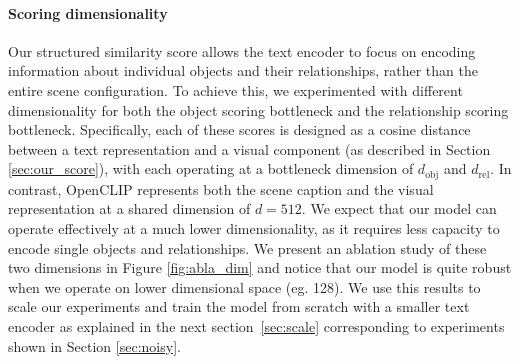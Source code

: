 \iffalse
\begin{figure}[ht]
\centering
    \begin{subfigure}[b]{0.2\textwidth}
        \centering    
    \texttt{[image: figures/ablation\_task\_coef\_swap\_att.pdf]}
        \caption{Swap Att}
    \end{subfigure}%
    \hfill
    \begin{subfigure}[b]{0.2\textwidth}
        \centering    \texttt{[image: figures/ablation\_task\_coef\_swap\_obj.pdf]}
        \caption{Swap Obj}
    \end{subfigure}%
    \hfill
    \begin{subfigure}[b]{0.2\textwidth}
        \centering    \texttt{[image: figures/ablation\_task\_coef\_replace\_obj.pdf]}
        \caption{Replace Obj}
    \end{subfigure}%
    \hfill
    \begin{subfigure}[b]{0.2\textwidth}
        \centering    \texttt{[image: figures/ablation\_task\_coef\_replace\_att.pdf]}
        \caption{Replace Att}
    \end{subfigure}%
    \hfill
    \begin{subfigure}[b]{0.19\textwidth}
        \centering    \texttt{[image: figures/ablation\_task\_coef\_replace\_rel.pdf]}
        \caption{Replace Rel}
    \end{subfigure}%
  \caption{ \textbf{Local Perturbed Graphs Ablation} In this ablations we keep the initialization seed fixed and include a perturbed graph as a negative sample inside the loss by swapping the order of the subject and object (y-axis), $\bar{G}$ or sampling random subject and object within the positive scene graph (x-axis), $\tilde{G}$.}
  \label{fig:abla_coefs}
\end{figure}
\fi

\paragraph{Scoring dimensionality} Our structured similarity score allows the text encoder to focus on encoding information about individual objects and their relationships, rather than the entire scene configuration. To achieve this, we experimented with different dimensionality for both the object scoring bottleneck and the relationship scoring bottleneck. Specifically, each of these scores is designed as a cosine distance between a text representation and a visual component (as described in Section \ref{sec:our_score}), with each operating at a bottleneck dimension of $d_{\text{obj}}$ and $d_{\text{rel}}$. In contrast, OpenCLIP represents both the scene caption and the visual representation at a shared dimension of $d=512$. We expect that our model can operate effectively at a much lower dimensionality, as it requires less capacity to encode single objects and relationships. We present an ablation study of these two dimensions in Figure \ref{fig:abla_dim} and notice that our model is quite robust when we operate on lower dimensional space (eg. 128). We use this results to scale our experiments and train the model from scratch with a smaller text encoder as explained in the next section~\ref{sec:scale} corresponding to experiments shown in Section \ref{sec:noisy}.

